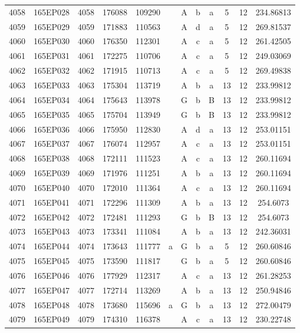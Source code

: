 \begin{tabular}{|*{12}{c|}}
4058 & 165EP028 & 4058 & 176088 & 109290 &  & A & b & a & 5 & 12 & 234.86813 \\ 
4059 & 165EP029 & 4059 & 171883 & 110563 &  & A & d & a & 5 & 12 & 269.81537 \\ 
4060 & 165EP030 & 4060 & 176350 & 112301 &  & A & c & a & 5 & 12 & 261.42505 \\ 
4061 & 165EP031 & 4061 & 172275 & 110706 &  & A & c & a & 5 & 12 & 249.03069 \\ 
4062 & 165EP032 & 4062 & 171915 & 110713 &  & A & c & a & 5 & 12 & 269.49838 \\ 
4063 & 165EP033 & 4063 & 175304 & 113719 &  & A & b & a & 13 & 12 & 233.99812 \\ 
4064 & 165EP034 & 4064 & 175643 & 113978 &  & G & b & B & 13 & 12 & 233.99812 \\ 
4065 & 165EP035 & 4065 & 175704 & 113949 &  & G & b & B & 13 & 12 & 233.99812 \\ 
4066 & 165EP036 & 4066 & 175950 & 112830 &  & A & d & a & 13 & 12 & 253.01151 \\ 
4067 & 165EP037 & 4067 & 176074 & 112957 &  & A & c & a & 13 & 12 & 253.01151 \\ 
4068 & 165EP038 & 4068 & 172111 & 111523 &  & A & c & a & 13 & 12 & 260.11694 \\ 
4069 & 165EP039 & 4069 & 171976 & 111251 &  & A & b & a & 13 & 12 & 260.11694 \\ 
4070 & 165EP040 & 4070 & 172010 & 111364 &  & A & c & a & 13 & 12 & 260.11694 \\ 
4071 & 165EP041 & 4071 & 172296 & 111309 &  & A & b & a & 13 & 12 & 254.6073 \\ 
4072 & 165EP042 & 4072 & 172481 & 111293 &  & G & b & B & 13 & 12 & 254.6073 \\ 
4073 & 165EP043 & 4073 & 173341 & 111084 &  & A & b & a & 13 & 12 & 242.36031 \\ 
4074 & 165EP044 & 4074 & 173643 & 111777 & a & G & b & a & 5 & 12 & 260.60846 \\ 
4075 & 165EP045 & 4075 & 173590 & 111817 &  & G & b & a & 5 & 12 & 260.60846 \\ 
4076 & 165EP046 & 4076 & 177929 & 112317 &  & A & c & a & 13 & 12 & 261.28253 \\ 
4077 & 165EP047 & 4077 & 172714 & 113269 &  & A & b & a & 13 & 12 & 250.94846 \\ 
4078 & 165EP048 & 4078 & 173680 & 115696 & a & G & b & a & 13 & 12 & 272.00479 \\ 
4079 & 165EP049 & 4079 & 174310 & 116378 &  & A & c & a & 13 & 12 & 230.22748 \\ 

\end{tabular}

